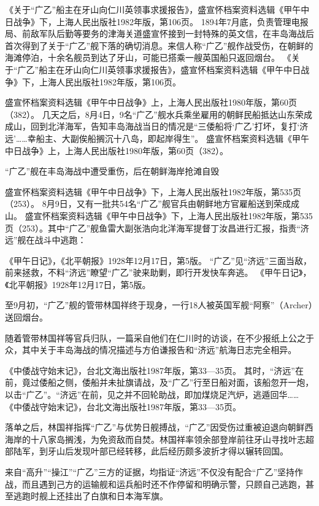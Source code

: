 \documentclass[12pt,UTF8]{ctexbook}
\begin{document}
《关于“广乙”船主在牙山向仁川英领事求援报告》，盛宣怀档案资料选辑《甲午中日战争》下，上海人民出版社1982年版，第106页。
1894年7月底，负责管理电报局、前敌军队后勤等要务的津海关道盛宣怀接到一封特殊的英文信，在丰岛海战后首次得到了关于“广乙”舰下落的确切消息。来信人称“广乙”舰作战受伤，在朝鲜的海滩停泊，十余名舰员到达了牙山，可能已搭乘一艘英国船只返回烟台。 《关于“广乙”船主在牙山向仁川英领事求援报告》，盛宣怀档案资料选辑《甲午中日战争》下，上海人民出版社1982年版，第106页。

盛宣怀档案资料选辑《甲午中日战争》上，上海人民出版社1980年版，第60页（382）。
几天之后，8月4日，9名“广乙”舰水兵乘坐雇用的朝鲜民船抵达山东荣成成山，回到北洋海军，告知丰岛海战当日的情况是“三倭船将‘广乙’打坏，复打‘济远’……幸船主、大副俟船搁沉十八岛，即起岸得生”。 盛宣怀档案资料选辑《甲午中日战争》上，上海人民出版社1980年版，第60页（382）。


“广乙”舰在丰岛海战中遭受重伤，后在朝鲜海岸抢滩自毁

盛宣怀档案资料选辑《甲午中日战争》下，上海人民出版社1982年版，第535页（253）。
8月9日，又有一批共54名“广乙”舰官兵由朝鲜地方官雇船送到荣成成山。 盛宣怀档案资料选辑《甲午中日战争》下，上海人民出版社1982年版，第535页（253）。其中“广乙”舰鱼雷大副张浩向北洋海军提督丁汝昌进行汇报，指责“济远”舰在战斗中逃跑：

《甲午日记》，《北平朝报》1928年12月17日，第5版。
“广乙”见“济远”三面当敌，前来拯救，不料“济远”瞭望“广乙”驶来助剿，即行开发快车奔逃。 《甲午日记》，《北平朝报》1928年12月17日，第5版。

至9月初，“广乙”舰的管带林国祥终于现身，一行18人被英国军舰“阿察”（Archer）送回烟台。

随着管带林国祥等官兵归队，一篇采自他们在仁川时的访谈，在不少报纸上公之于众，其中关于丰岛海战的情况描述与方伯谦报告和“济远”航海日志完全相异。

《中倭战守始末记》，台北文海出版社1987年版，第33—35页。
其时，“济远”在前，竟过倭船之侧，倭船并未扯旗请战，及“广乙”行至日船对面，该船忽开一炮，以击“广乙”。“济远”在前，见之并不回轮助战，即加煤烧足汽炉，逃遁回华…… 《中倭战守始末记》，台北文海出版社1987年版，第33—35页。

落单之后，林国祥指挥“广乙”与优势日舰搏战，“广乙”因受伤过重被迫退向朝鲜西海岸的十八家岛搁浅，为免资敌而自焚。林国祥率领余部登岸前往牙山寻找叶志超部陆军，到牙山后发现叶部已经转移，此后经历颇多波折才得以辗转回国。

来自“高升”“操江”“广乙”三方的证据，均指证“济远”不仅没有配合“广乙”坚持作战，而且遇到己方的运输舰和运兵船时还不作停留和明确示警，只顾自己逃跑，甚至逃跑时舰上还挂出了白旗和日本海军旗。
\end{document}
